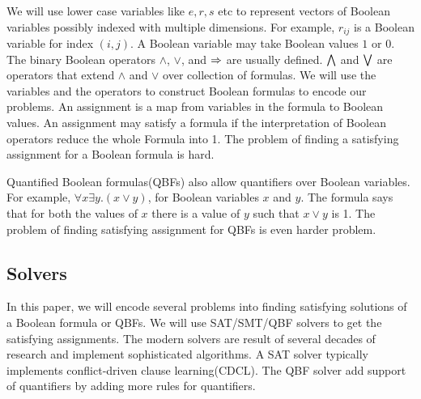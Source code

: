 We will use lower case variables like $e,r,s$ etc to represent vectors of Boolean variables
possibly indexed with multiple dimensions.
%
For example, $r_{ij}$ is a Boolean variable for index $(i,j)$.
%
%
A Boolean variable may take Boolean values $1$ or $0$.
%
The binary Boolean operators $\land$, $\lor$, and $\Rightarrow$ are usually defined.
%
$\bigwedge$ and $\bigvee$ are operators that extend $\land$ and $\lor$ over
collection of formulas.
%
We will use the variables and the operators to construct Boolean formulas to
encode our problems.
%
An assignment is a map from variables in the formula to Boolean values.
%
An assignment may satisfy a formula if the interpretation of Boolean operators
reduce the whole Formula into 1.
%
The problem of finding a satisfying assignment for a Boolean formula is
hard.
%

Quantified Boolean formulas(QBFs) also allow quantifiers over Boolean variables.
%
For example, $\forall x \exists y. (x \lor y)$, for Boolean variables $x$ and $y$.
%
The formula says that for both the values of $x$ there is a value of $y$
such that $x \lor y$ is 1.
%
The problem of finding satisfying assignment for QBFs is even harder problem.
%


\subsection{Solvers}
In this paper, we will encode several problems into finding satisfying
solutions of a Boolean formula or QBFs.
%
We will use SAT/SMT/QBF solvers to get the satisfying assignments.
%
The modern solvers are result of several decades of research
and implement sophisticated algorithms.
%
A SAT solver typically implements conflict-driven clause learning(CDCL).
%
The QBF solver add support of quantifiers by adding more rules for
quantifiers.

%
%

